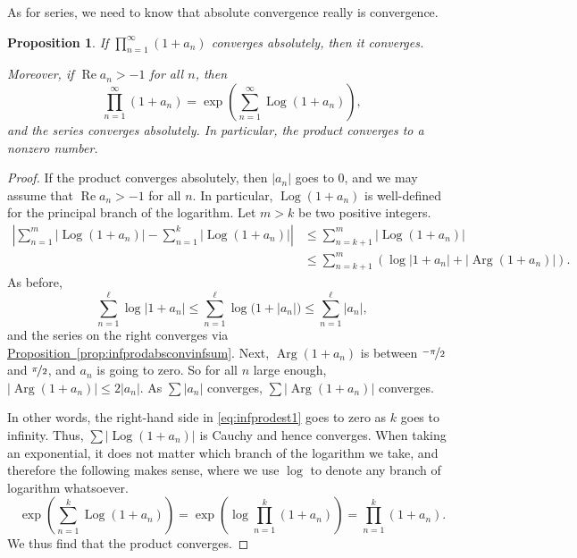 \documentclass[12pt,openany]{book}
\renewcommand{\Re}{\operatorname{Re}}
\newcommand{\Arg}{\operatorname{Arg}}
\newcommand{\Log}{\operatorname{Log}}
\newcommand{\sabs}[1]{\lvert {#1} \rvert}
\newcommand{\babs}[1]{\bigl\lvert {#1} \bigr\rvert}
\newcommand{\abs}[1]{\left\lvert {#1} \right\rvert}
\theoremstyle{plain}
\newtheorem{prop}[thm]{Proposition}
\theoremstyle{remark}
\theoremstyle{definition}
\theoremstyle{exercise}
\theoremstyle{example}
\newcommand{\propref}[1]{\hyperref[#1]{Proposition~\ref*{#1}}}
\begin{document}
As for series, we need to know that absolute convergence really is convergence.

\begin{prop} \label{prop:infproductwithlogs}
If $\prod_{n=1}^\infty (1+a_n)$ converges absolutely, then it converges.

Moreover, if $\Re a_n > -1$ for all $n$, then 
\begin{equation*}
\prod_{n=1}^\infty (1+a_n)
=
\exp\left(
\sum_{n=1}^\infty \Log(1+a_n)
\right),
\end{equation*}
and the series converges absolutely.  In particular, the product
converges to a nonzero number.
\end{prop}

\begin{proof}
If the product converges absolutely, then $\sabs{a_n}$ goes to $0$, and we
may assume that $\Re a_n > -1$ for all $n$.  In particular,
$\Log (1+a_n)$ is well-defined for the principal branch of the logarithm.
Let $m > k$ be two positive integers.
\begin{equation} \label{eq:infprodest1}
\begin{split}
\abs{
\sum_{n=1}^m 
\abs{\Log (1+a_n)}
-
\sum_{n=1}^k 
\abs{\Log (1+a_n)}
}
& \leq
\sum_{n=k+1}^m 
\abs{
\Log (1+a_n)
}
\\
& \leq
\sum_{n=k+1}^m 
\left(
\log \sabs{1+a_n}
+
\abs{ \Arg (1+a_n)}
\right) .
\end{split}
\end{equation}
As before,
\begin{equation*}
\sum_{n=1}^\ell \log \sabs{1+a_n} \leq
\sum_{n=1}^\ell \log \bigl(1+\sabs{a_n}\bigr)
\leq
\sum_{n=1}^\ell \sabs{a_n} ,
\end{equation*}
and the series on the right converges via \propref{prop:infprodabsconvinfsum}.
Next, $\Arg(1+a_n)$ is between $\nicefrac{-\pi}{2}$ and
$\nicefrac{\pi}{2}$, and $a_n$ is going to zero.  So for all $n$ large
enough, $\babs{\Arg(1+a_n)} \leq 2\sabs{a_n}$.  As $\sum
\sabs{a_n}$ converges, 
$\sum \babs{\Arg (1+a_n)}$ converges.

In other words, the right-hand side in \eqref{eq:infprodest1} goes to zero
as $k$ goes to infinity.  Thus, $\sum \babs{\Log(1+a_n)}$ is Cauchy and hence
converges.  When taking an exponential, it does not matter which branch of
the logarithm we take, and therefore the following makes sense, where we use
$\log$ to denote any branch of logarithm whatsoever.
\begin{equation*}
\exp\left(
\sum_{n=1}^k \Log(1+a_n)
\right)
=
\exp\left(
\log \prod_{n=1}^k (1+a_n)
\right)
=
\prod_{n=1}^k (1+a_n) .
\end{equation*}
We thus find that the product converges.
\end{proof}
\end{document}
